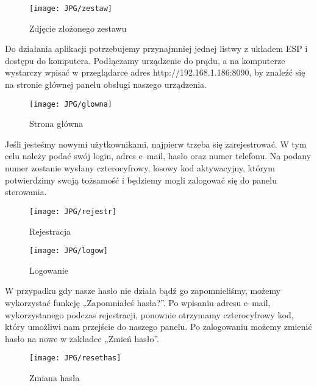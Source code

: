 \documentclass{xmgr}
\begin{document}
\hspace{2cm}
\begin{figure}[h]
\begin{center}
\texttt{[image: JPG/zestaw]}
\caption{Zdjęcie złożonego zestawu}
\end{center}
\end{figure}

\newpage

Do działania aplikacji potrzebujemy przynajmniej jednej listwy z układem ESP  i dostępu do komputera. Podłączamy urządzenie do prądu, a na komputerze wystarczy wpisać w przeglądarce adres  http://192.168.1.186:8090, by znaleźć się na stronie głównej panelu obsługi naszego urządzenia. 

\hspace{2cm}
\begin{figure}[h]
\begin{center}
\texttt{[image: JPG/glowna]}
\caption{Strona główna}
\end{center}
\end{figure}

Jeśli jesteśmy nowymi użytkownikami, najpierw trzeba się zarejestrować. W tym celu należy podać swój login, adres e--mail, hasło oraz numer telefonu. Na podany numer zostanie wysłany czterocyfrowy, losowy kod aktywacyjny, którym potwierdzimy swoją tożsamość i będziemy mogli zalogować się do panelu sterowania.

\begin{figure}
\begin{center}
\texttt{[image: JPG/rejestr]}
\caption{Rejestracja}
\end{center}
\end{figure}

\begin{figure}
\begin{center}
\texttt{[image: JPG/logow]}
\caption{Logowanie}
\end{center}
\end{figure}

\newpage W przypadku gdy nasze hasło nie działa bądź go zapomnieliśmy, możemy wykorzystać funkcję  „Zapomniałeś hasła?”. Po wpisaniu adresu e--mail, wykorzystanego podczas rejestracji, ponownie otrzymamy czterocyfrowy kod, który umożliwi nam przejście do naszego panelu. Po zalogowaniu możemy zmienić hasło na nowe w zakładce „Zmień hasło”.

\hspace{2cm}
\begin{figure}[h]
\begin{center}
\texttt{[image: JPG/resethas]}
\caption{Zmiana hasła}
\end{center}
\end{figure}
\end{document}
